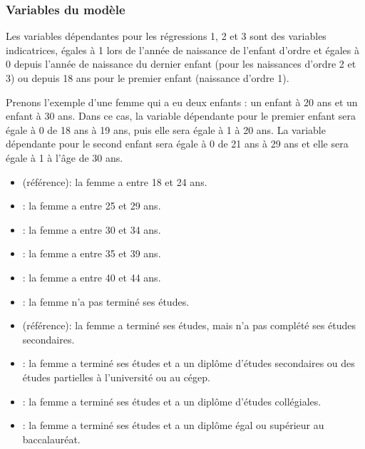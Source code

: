 \documentclass[letterpaper,10pt,french]{sphinxmanual}
\begin{document}
\subsubsection{Variables du modèle}
\label{\detokenize{methodologie:variables-du-modele}}
Les variables dépendantes pour les régressions 1, 2 et 3 sont des variables indicatrices,
égales à 1 lors de l’année de naissance de l’enfant d’ordre 
et égales à 0 depuis l’année de naissance du dernier enfant (pour les naissances d’ordre 2 et 3) ou
depuis 18 ans pour le premier enfant (naissance d’ordre 1).

Prenons l’exemple d’une femme qui a eu deux enfants : un enfant à 20 ans et un enfant à 30 ans.
Dans ce cas, la variable dépendante pour le premier enfant sera égale à 0 de 18 ans à 19 ans, puis elle sera égale à 1 à 20 ans.
La variable dépendante pour le second enfant sera égale à 0 de 21 ans à 29 ans et elle sera égale à 1 à l’âge de 30 ans.

\begin{itemize}
\item {} 
 (référence): la femme a entre 18 et 24 ans.

\item {} 
: la femme a entre 25 et 29 ans.

\item {} 
: la femme a entre 30 et 34 ans.

\item {} 
: la femme a entre 35 et 39 ans.

\item {} 
: la femme a entre 40 et 44 ans.

\end{itemize}

\begin{itemize}
\item {} 
: la femme n’a pas terminé ses études.

\item {} 
 (référence): la femme a terminé ses études, mais n’a pas complété ses études secondaires.

\item {} 
: la femme a terminé ses études et a un diplôme d’études secondaires ou des études partielles à l’université ou au cégep.

\item {} 
: la femme a terminé ses études et a un diplôme d’études collégiales.

\item {} 
: la femme a terminé ses études et a un diplôme égal ou supérieur au baccalauréat.

\end{itemize}
\end{document}
